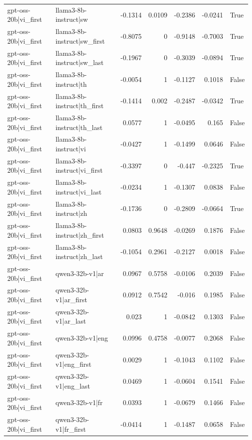 \begin{table}
\begin{tabular}{l l r r r r l}
gpt-oss-20b|vi_first & llama3-8b-instruct|sw & -0.1314 & 0.0109 & -0.2386 & -0.0241 & True \\
gpt-oss-20b|vi_first & llama3-8b-instruct|sw_first & -0.8075 & 0 & -0.9148 & -0.7003 & True \\
gpt-oss-20b|vi_first & llama3-8b-instruct|sw_last & -0.1967 & 0 & -0.3039 & -0.0894 & True \\
gpt-oss-20b|vi_first & llama3-8b-instruct|th & -0.0054 & 1 & -0.1127 & 0.1018 & False \\
gpt-oss-20b|vi_first & llama3-8b-instruct|th_first & -0.1414 & 0.002 & -0.2487 & -0.0342 & True \\
gpt-oss-20b|vi_first & llama3-8b-instruct|th_last & 0.0577 & 1 & -0.0495 & 0.165 & False \\
gpt-oss-20b|vi_first & llama3-8b-instruct|vi & -0.0427 & 1 & -0.1499 & 0.0646 & False \\
gpt-oss-20b|vi_first & llama3-8b-instruct|vi_first & -0.3397 & 0 & -0.447 & -0.2325 & True \\
gpt-oss-20b|vi_first & llama3-8b-instruct|vi_last & -0.0234 & 1 & -0.1307 & 0.0838 & False \\
gpt-oss-20b|vi_first & llama3-8b-instruct|zh & -0.1736 & 0 & -0.2809 & -0.0664 & True \\
gpt-oss-20b|vi_first & llama3-8b-instruct|zh_first & 0.0803 & 0.9648 & -0.0269 & 0.1876 & False \\
gpt-oss-20b|vi_first & llama3-8b-instruct|zh_last & -0.1054 & 0.2961 & -0.2127 & 0.0018 & False \\
gpt-oss-20b|vi_first & qwen3-32b-v1|ar & 0.0967 & 0.5758 & -0.0106 & 0.2039 & False \\
gpt-oss-20b|vi_first & qwen3-32b-v1|ar_first & 0.0912 & 0.7542 & -0.016 & 0.1985 & False \\
gpt-oss-20b|vi_first & qwen3-32b-v1|ar_last & 0.023 & 1 & -0.0842 & 0.1303 & False \\
gpt-oss-20b|vi_first & qwen3-32b-v1|eng & 0.0996 & 0.4758 & -0.0077 & 0.2068 & False \\
gpt-oss-20b|vi_first & qwen3-32b-v1|eng_first & 0.0029 & 1 & -0.1043 & 0.1102 & False \\
gpt-oss-20b|vi_first & qwen3-32b-v1|eng_last & 0.0469 & 1 & -0.0604 & 0.1541 & False \\
gpt-oss-20b|vi_first & qwen3-32b-v1|fr & 0.0393 & 1 & -0.0679 & 0.1466 & False \\
gpt-oss-20b|vi_first & qwen3-32b-v1|fr_first & -0.0414 & 1 & -0.1487 & 0.0658 & False \\

\end{tabular}
\end{table}
